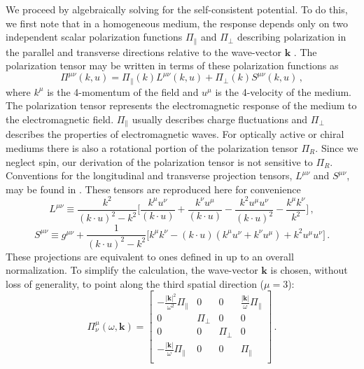  We proceed by algebraically solving for the self-consistent potential. To do this, we first note that in a homogeneous medium, the response depends only on two independent scalar polarization functions $\Pi_\parallel$ and $\Pi_\perp$ describing polarization in the parallel and transverse directions relative to the wave-vector $\boldsymbol{k}$ \cite{Weldon:1982aq}. The polarization tensor may be written in terms of these polarization functions as
\begin{equation}\label{eq:poltensgen}
 \Pi^{\mu \nu}(k,u) = \Pi_\parallel(k) L^{\mu \nu}(k,u) + \Pi_\perp(k) S^{\mu \nu}(k,u)\,,
\end{equation}
where $k^\mu$ is the 4-momentum of the field and $u^\mu$ is the 4-velocity of the medium. The polarization tensor represents the electromagnetic response of the medium to the electromagnetic field. $\Pi_\parallel$ usually describes charge fluctuations and $\Pi_\perp$ describes the properties of electromagnetic waves. For optically active or chiral mediums there is also a rotational portion of the polarization tensor $\Pi_R$. Since we neglect spin, our derivation of the polarization tensor is not sensitive to $\Pi_R$. Conventions for the longitudinal and transverse projection tensors, $L^{\mu \nu}$ and  $S^{\mu \nu}$, may be found in \cite{melrose2008quantum}. These tensors are reproduced here for convenience
\begin{equation}
     L^{\mu \nu} \equiv \frac{k^2}{(k\cdot u)^2-k^2}\bigg[ \frac{ k^{\mu}u^{\nu}}{(k\cdot u)}+ \frac{ k^{\nu}u^{\mu}}{(k\cdot u)} -\frac{k^2u^{\mu}u^{\nu}}{(k\cdot u)^2}  -\frac{k^{\mu}k^{\nu}}{k^2} \bigg]\,,
\end{equation}
\begin{equation}
     S^{\mu \nu} \equiv g^{\mu \nu} +\frac{1}{(k\cdot u)^2-k^2}\bigg[ k^{\mu}k^{\nu} 
     -(k\cdot u)( k^{\mu}u^{\nu}+k^{\nu}u^{\mu})+k^2u^{\mu}u^{\nu}\bigg]\,.
\end{equation}
These projections are equivalent to ones defined in \cite{Weldon:1982aq} up to an overall normalization. To simplify the calculation, the wave-vector $\boldsymbol{k}$ is chosen, without loss of generality, to point along the third spatial direction ($\mu=3$):
 \begin{equation}\label{eq:poltenmat}
    \Pi^{\mu}_{\nu}(\omega,\boldsymbol{k}) = \left[
    \begin{array}{cccc}
-\frac{|\mathbf{k}|^2}{\omega^2}\Pi_{\parallel}& 0 & 0 & \frac{|\mathbf{k}|}{\omega}\Pi_{\parallel} \\
 0 & \Pi_{\perp} & 0 & 0 \\
 0 & 0 & \Pi_{\perp} & 0 \\
 -\frac{|\mathbf{k}|}{\omega}\Pi_{\parallel} & 0 & 0 & \Pi_{\parallel} \\ 
\end{array}
\right]\,.
\end{equation}
